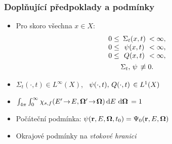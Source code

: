 \begin{frame}
  \frametitle{Doplňující předpoklady a podmínky}
  \begin{itemize}
  	\item Pro skoro všechna $x\in X$: 
  	$$
  	\begin{gathered}
	    \begin{array}{ccl}
	    0 \leq& \!\!\!\Sigma_t(x,t)\!\!\! &< \infty,\\
	    0 \leq& \!\!\!\angflux(x,t)\!\!\! &< \infty,\\
	    0 \leq& \!\!\!Q(x,t)\!\!\! &< \infty,
	    \end{array}\\
	    \Sigma_t,\, \angflux\, \not\equiv 0.
	    \end{gathered}
    $$
    \item $\Sigma_t(\cdot,t)\in L^{\infty}(X)$,~ $\psi(\cdot,t),\, Q(\cdot,t)\, \in L_{}^{1}(X)$\vspace{.5em}
    \item $\int_{4\pi}{\int_{0}^{\infty}\chi_{s,f}(E'\!\rightarrow\! E, \mathbf{\Omega}'\!\rightarrow\! \mathbf{\Omega})\,\mathrm{d}E\,}\,\mathrm{d}\mathbf{\Omega}\, = 1$\vspace{.5em}
    \item Počáteční podmínka: $\psi(\mathbf{r},E,\mathbf{\Omega},t_0) = \Psi_0(\mathbf{r},E,\mathbf{\Omega})$\vspace{.5em}
    \item Okrajové podmínky na \emph{\color{structure}vtokové hranici}
  \end{itemize}
  
  
\end{frame}

